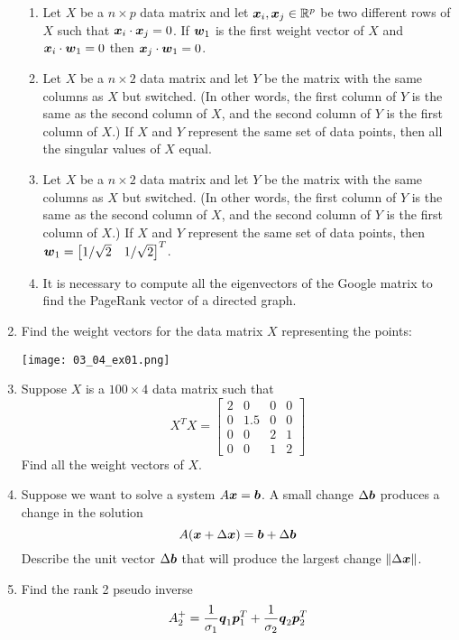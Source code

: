 \begin{enumerate}[leftmargin=*]
\begin{enumerate}
\item Let $X$ be a $n \times p$ data matrix and let $\boldsymbol{x}_i , \boldsymbol{x}_j \in \mathbb{R}^p$ be two different rows of $X$ such that $\boldsymbol{x}_i \cdot \boldsymbol{x}_j = 0$. If $\boldsymbol{w}_1$ is the first weight vector of $X$ and $\boldsymbol{x}_i \cdot \boldsymbol{w}_1 = 0$ then $\boldsymbol{x}_j \cdot \boldsymbol{w}_1 = 0$.
\item Let $X$ be a $n \times 2$ data matrix and let $Y$ be the matrix with the same columns as $X$ but switched. (In other words, the first column of $Y$ is the same as the second column of $X$, and the second column of $Y$ is the first column of $X$.) If $X$ and $Y$ represent the same set of data points, then all the singular values of $X$ equal.
\item Let $X$ be a $n \times 2$ data matrix and let $Y$ be the matrix with the same columns as $X$ but switched. (In other words, the first column of $Y$ is the same as the second column of $X$, and the second column of $Y$ is the first column of $X$.) If $X$ and $Y$ represent the same set of data points, then $\boldsymbol{w}_1 = \begin{bmatrix} 1/\sqrt{2} & 1/\sqrt{2} \end{bmatrix}^T$.
\item It is necessary to compute all the eigenvectors of the Google matrix to find the PageRank vector of a directed graph.
\end{enumerate}
\item Find the weight vectors for the data matrix $X$ representing the points:
\begin{center}
\texttt{[image: 03\_04\_ex01.png]}
\end{center}
\item Suppose $X$ is a $100 \times 4$ data matrix such that
$$
X^T X = \begin{bmatrix} 2 & 0 & 0 & 0 \\ 0 & 1.5 & 0 & 0 \\ 0 & 0 & 2 & 1 \\ 0 & 0 & 1 & 2 \end{bmatrix}
$$
Find all the weight vectors of $X$.
\item Suppose we want to solve a system $A \boldsymbol{x} = \boldsymbol{b}$. A small change $\Delta \boldsymbol{b}$ produces a change in the solution
$$
A(\boldsymbol{x} + \Delta \boldsymbol{x}) = \boldsymbol{b} + \Delta \boldsymbol{b}
$$
Describe the unit vector $\Delta \boldsymbol{b}$ that will produce the largest change $\| \Delta \boldsymbol{x} \|$.
\item Find the rank 2 pseudo inverse
$$
A_2^+ = \frac{1}{\sigma_1} \boldsymbol{q}_1 \boldsymbol{p}_1^T + \frac{1}{\sigma_2} \boldsymbol{q}_2 \boldsymbol{p}_2^T
$$
\end{enumerate}
